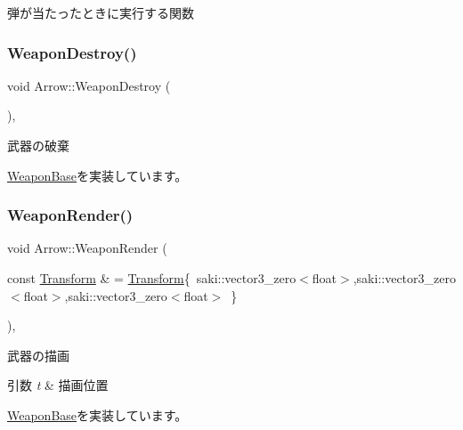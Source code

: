 弾が当たったときに実行する関数 

\mbox{\label{class_arrow_a1101d1159771b5c428afd3c7a6a0a4df}} 
\subsubsection{\texorpdfstring{Weapon\+Destroy()}{WeaponDestroy()}}
{\footnotesize\ttfamily void Arrow\+::\+Weapon\+Destroy (\begin{DoxyParamCaption}{ }\end{DoxyParamCaption})\hspace{0.3cm}{\ttfamily [final]}, {\ttfamily [virtual]}}



武器の破棄 



\mbox{\hyperlink{class_weapon_base_a417784a8c8bf73cd398a77b922fc110c}{Weapon\+Base}}を実装しています。

\mbox{\label{class_arrow_af9e54760156a77a15ad98a88f712ebdb}} 
\subsubsection{\texorpdfstring{Weapon\+Render()}{WeaponRender()}}
{\footnotesize\ttfamily void Arrow\+::\+Weapon\+Render (\begin{DoxyParamCaption}\item[{const \mbox{\hyperlink{common_8h_a1c43cb8f0d8a41901f3ce4c67dbbce20}{Transform}} \&}]{ = {\ttfamily \mbox{\hyperlink{common_8h_a1c43cb8f0d8a41901f3ce4c67dbbce20}{Transform}}\{~saki\+:\+:vector3\+\_\+zero$<$float$>$,saki\+:\+:vector3\+\_\+zero$<$float$>$,saki\+:\+:vector3\+\_\+zero$<$float$>$~\}} }\end{DoxyParamCaption})\hspace{0.3cm}{\ttfamily [final]}, {\ttfamily [virtual]}}



武器の描画 


\begin{DoxyParams}{引数}
{\em t} & 描画位置 \\
\hline
\end{DoxyParams}


\mbox{\hyperlink{class_weapon_base_af308d16d3892c3ffaeedf74b08e761b9}{Weapon\+Base}}を実装しています。

